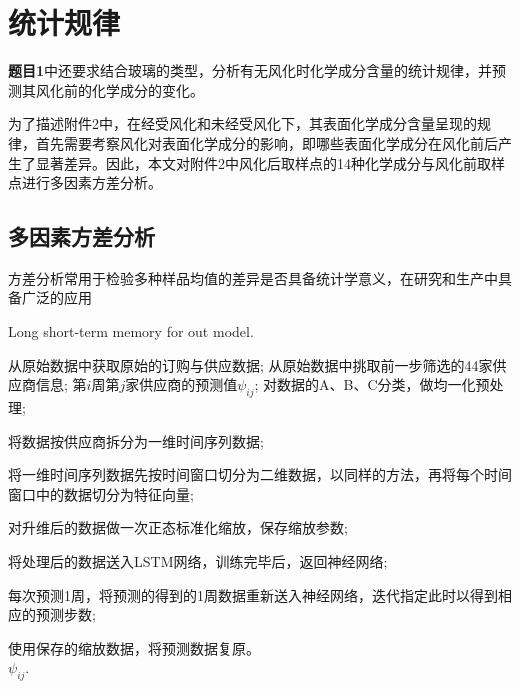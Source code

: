 




\section{统计规律} %
\label{sec:统计规律}

\textbf{题目1}中还要求结合玻璃的类型，分析有无风化时化学成分含量的统计规律，并预测其风化前的化学成分的变化。

为了描述附件2中，在经受风化和未经受风化下，其表面化学成分含量呈现的规律，首先需要考察风化对表面化学成分的影响，即哪些表面化学成分在风化前后产生了显著差异。因此，本文对附件2中风化后取样点的14种化学成分与风化前取样点进行多因素方差分析。

\subsection{多因素方差分析} %
\label{sub:多因素方差分析}

方差分析常用于检验多种样品均值的差异是否具备统计学意义，在研究和生产中具备广泛的应用

\begin{algorithm}[htb]
  \caption{ Long short-term memory for out model.}
  \label{alg:lstm}
  \begin{algorithmic}[1]
    \Require
      从原始数据中获取原始的订购与供应数据;
      从原始数据中挑取前一步筛选的44家供应商信息;
    \Ensure
      第$i$周第$j$家供应商的预测值$\psi_{i j}$;
    \State 对数据的A、B、C分类，做均一化预处理;

    \State 将数据按供应商拆分为一维时间序列数据;

    \State 将一维时间序列数据先按时间窗口切分为二维数据，以同样的方法，再将每个时间窗口中的数据切分为特征向量;

    \State 对升维后的数据做一次正态标准化缩放，保存缩放参数;

    \State 将处理后的数据送入LSTM网络，训练完毕后，返回神经网络;

    \State 每次预测1周，将预测的得到的1周数据重新送入神经网络，迭代指定此时以得到相应的预测步数;

    \State 使用保存的缩放数据，将预测数据复原。\\
    \Return $\psi_{i j}$.
  \end{algorithmic}
\end{algorithm}


